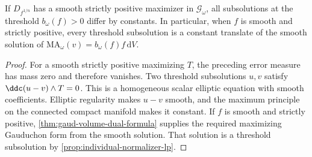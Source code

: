 \begin{corollary}\label{cor:smooth-dual-threshold-rigidity}
If $D_{f^{1/n}}$ has a smooth strictly positive maximizer in $\mathscr G_\omega$, all subsolutions at the threshold $b_\omega(f)>0$ differ by constants. In particular, when $f$ is smooth and strictly positive, every threshold subsolution is a constant translate of the smooth solution of
$\mathrm{MA}_\omega(v)=b_\omega(f)f\,\mathrm{d}V$.
\end{corollary}
\begin{proof}
For a smooth strictly positive maximizing $T$, the preceding error measure has mass zero and therefore vanishes. Two threshold subsolutions $u,v$ satisfy $\ddc(u-v)\wedge T=0$. This is a homogeneous scalar elliptic equation with smooth coefficients. Elliptic regularity makes $u-v$ smooth, and the maximum principle on the connected compact manifold makes it constant. If $f$ is smooth and strictly positive, \cref{thm:gaud-volume-dual-formula} supplies the required maximizing Gauduchon form from the smooth solution. That solution is a threshold subsolution by \cref{prop:individual-normalizer-lp}.
\end{proof}
